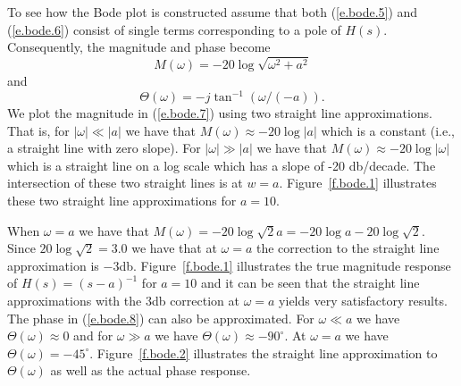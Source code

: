 	To see how the Bode plot is
constructed assume that both (\ref{e.bode.5}) and (\ref{e.bode.6}) consist
of single terms corresponding to a pole of $H(s)$.  Consequently, the 
magnitude and phase become
%
\begin{equation}
M(\omega)=-20\log\sqrt{\omega^2+a^2}
\label{e.bode.7}
\end{equation}
%
and
%
\begin{equation}
\Theta(\omega)=-j\tan^{-1}(\omega/(-a)).
\label{e.bode.8}
\end{equation}
%
We plot the magnitude in (\ref{e.bode.7}) using two straight line
approximations.  That is, for $|\omega|\ll|a|$ we have that $M(\omega)\approx
-20\log|a|$ which is a constant (i.e., a straight line with zero slope).
For $|\omega|\gg|a|$ we have that $M(\omega)\approx-20\log|\omega|$ which
is a straight line on a log scale which has a slope of -20 db/decade.
The intersection of these two straight lines is  at $w=a$.  
Figure~\ref{f.bode.1} illustrates these two straight line approximations
for $a=10$.
%

%
When $\omega=a$ we have that $M(\omega)=-20\log\sqrt{2}a=-20\log a
-20\log\sqrt{2}$.  Since $20\log\sqrt{2}=3.0$ we have that at $\omega=a$
the correction to the straight line approximation is $-3$db.
Figure~\ref{f.bode.1} illustrates the true magnitude response of 
$H(s)=(s-a)^{-1}$ for $a=10$
and it can be seen that the straight line approximations
with the 3db correction at $\omega=a$ yields very satisfactory results.
The phase in (\ref{e.bode.8}) can also be approximated.  For $\omega\ll a$
we have $\Theta(\omega)\approx 0$ and for $\omega\gg a$ we have
$\Theta(\omega)\approx -90^{\circ}$.  At $\omega=a$ we have $\Theta(\omega)
=-45^{\circ}$.  Figure~\ref{f.bode.2} illustrates the straight line 
approximation to $\Theta(\omega)$ as well as the actual phase response.
%

%

